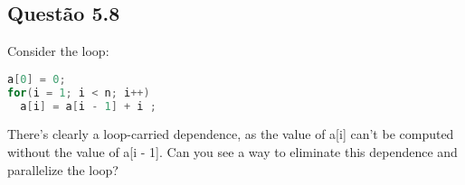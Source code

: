 
\subsection{Questão 5.8}

Consider the loop:
\begin{lstlisting}[language=C]
a[0] = 0;
for(i = 1; i < n; i++)
  a[i] = a[i - 1] + i ;
\end{lstlisting}

There’s clearly a loop-carried dependence, as the value of a[i] can’t be computed without the value of a[i - 1]. Can you see a way to eliminate this dependence and parallelize the loop?




